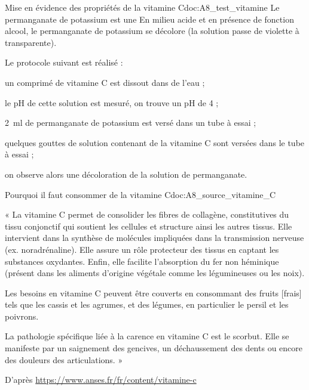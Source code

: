 \begin{doc}{Mise en évidence des propriétés de la vitamine C}{doc:A8_test_vitamine}
  Le permanganate de potassium est une 
  En milieu acide et en présence de fonction alcool, le permanganate de potassium se décolore (la solution passe de violette à transparente).

  Le protocole suivant est réalisé :
  \begin{protocole}
    \item un comprimé de vitamine C est dissout dans de l'eau ;
    \item le pH de cette solution est mesuré, on trouve un pH de 4 ;
    \item \qty{2}{\ml} de permanganate de potassium est versé dans un tube à essai ;
    \item quelques gouttes de solution contenant de la vitamine C sont versées dans le tube à essai ;
    \item on observe alors une décoloration de la solution de permanganate.
  \end{protocole}
\end{doc}





\begin{doc}{Pourquoi il faut consommer de la vitamine C}{doc:A8_source_vitamine_C}
  
  « La vitamine C permet de consolider les fibres de collagène, constitutives du tissu conjonctif qui soutient les cellules et structure ainsi les autres tissus.
  Elle intervient dans la synthèse de molécules impliquées dans la transmission nerveuse (ex. noradrénaline).
  Elle assure un rôle protecteur des tissus en captant les substances oxydantes.
  Enfin, elle facilite l’absorption du fer non héminique (présent dans les aliments d’origine végétale comme les légumineuses ou les noix). 
  \medskip
  
  Les besoins en vitamine C peuvent être couverts en consommant des fruits [frais] tels que les cassis et les agrumes, et des légumes, en particulier le persil et les poivrons.
  \medskip

  La pathologie spécifique liée à la carence en vitamine C est le scorbut.
  Elle se manifeste par un saignement des gencives, un déchaussement des dents ou encore des douleurs des articulations. »

  \begin{flushright}
    D'après \url{https://www.anses.fr/fr/content/vitamine-c}
  \end{flushright}
\end{doc}

